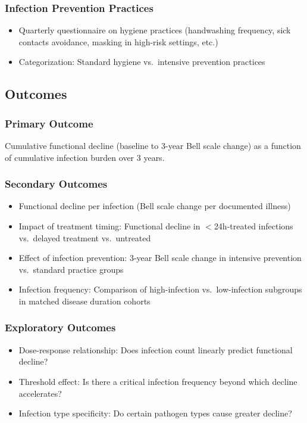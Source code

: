 \subsubsection{Infection Prevention Practices}
\begin{itemize}
    \item Quarterly questionnaire on hygiene practices (handwashing frequency, sick contacts avoidance, masking in high-risk settings, etc.)
    \item Categorization: Standard hygiene vs.\ intensive prevention practices
\end{itemize}

\subsection{Outcomes}

\subsubsection{Primary Outcome}
Cumulative functional decline (baseline to 3-year Bell scale change) as a function of cumulative infection burden over 3 years.

\subsubsection{Secondary Outcomes}
\begin{itemize}
    \item Functional decline per infection (Bell scale change per documented illness)
    \item Impact of treatment timing: Functional decline in $<$24h-treated infections vs.\ delayed treatment vs.\ untreated
    \item Effect of infection prevention: 3-year Bell scale change in intensive prevention vs.\ standard practice groups
    \item Infection frequency: Comparison of high-infection vs.\ low-infection subgroups in matched disease duration cohorts
\end{itemize}

\subsubsection{Exploratory Outcomes}
\begin{itemize}
    \item Dose-response relationship: Does infection count linearly predict functional decline?
    \item Threshold effect: Is there a critical infection frequency beyond which decline accelerates?
    \item Infection type specificity: Do certain pathogen types cause greater decline?
\end{itemize}

